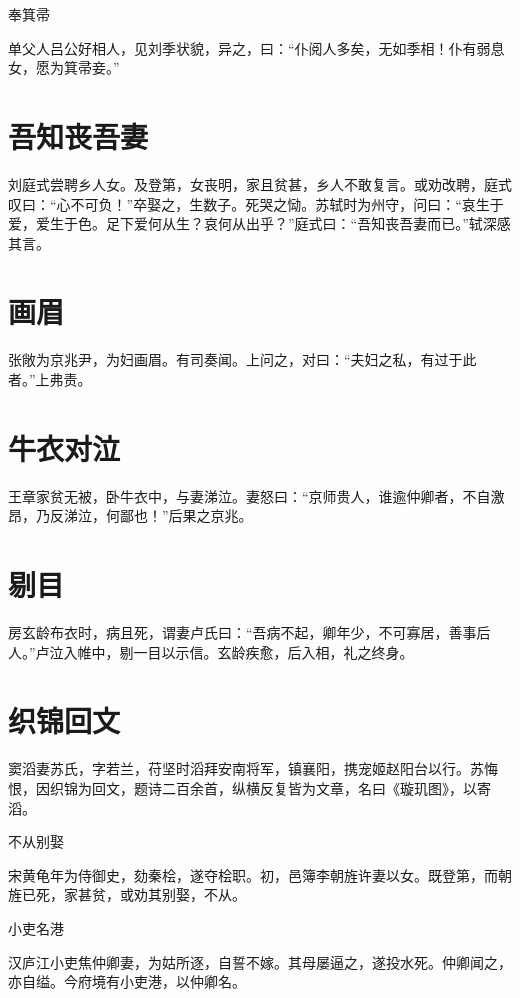\documentclass[a4paper,12pt,UTF8,twoside]{ctexbook}
\begin{document}
    奉箕帚
    
    单父人吕公好相人，见刘季状貌，异之，曰：“仆阅人多矣，无如季相！仆有弱息女，愿为箕帚妾。”
    
    \section{吾知丧吾妻}
    
    刘庭式尝聘乡人女。及登第，女丧明，家且贫甚，乡人不敢复言。或劝改聘，庭式叹曰：“心不可负！”卒娶之，生数子。死哭之恸。苏轼时为州守，问曰：“哀生于爱，爱生于色。足下爱何从生？哀何从出乎？”庭式曰：“吾知丧吾妻而已。”轼深感其言。
    
    \section{画眉}
    
    张敞为京兆尹，为妇画眉。有司奏闻。上问之，对曰：“夫妇之私，有过于此者。”上弗责。
    
    \section{牛衣对泣}
    
    王章家贫无被，卧牛衣中，与妻涕泣。妻怒曰：“京师贵人，谁逾仲卿者，不自激昂，乃反涕泣，何鄙也！”后果之京兆。
    
    \section{剔目}
    
    房玄龄布衣时，病且死，谓妻卢氏曰：“吾病不起，卿年少，不可寡居，善事后人。”卢泣入帷中，剔一目以示信。玄龄疾愈，后入相，礼之终身。
    
    \section{织锦回文}
    
    窦滔妻苏氏，字若兰，苻坚时滔拜安南将军，镇襄阳，携宠姬赵阳台以行。苏悔恨，因织锦为回文，题诗二百余首，纵横反复皆为文章，名曰《璇玑图》，以寄滔。
    
    不从别娶
    
    宋黄龟年为侍御史，劾秦桧，遂夺桧职。初，邑簿李朝旌许妻以女。既登第，而朝旌已死，家甚贫，或劝其别娶，不从。
    
    小吏名港
    
    汉庐江小吏焦仲卿妻，为姑所逐，自誓不嫁。其母屡逼之，遂投水死。仲卿闻之，亦自缢。今府境有小吏港，以仲卿名。
    
\end{document}
